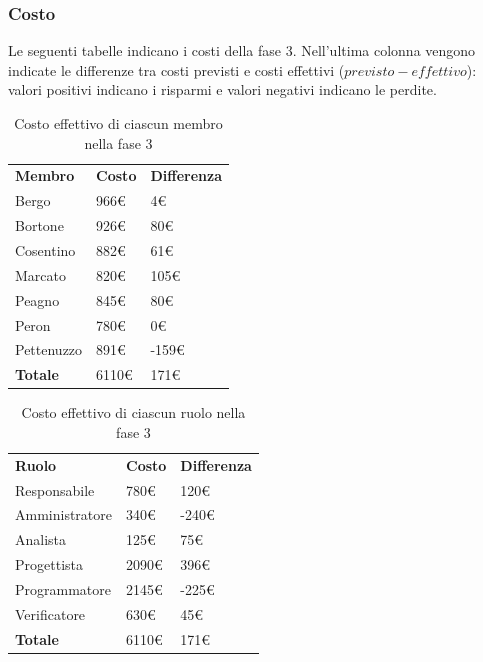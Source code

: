 	\subsubsection{Costo}
		Le seguenti tabelle indicano i costi della fase 3. Nell'ultima colonna vengono indicate le differenze tra costi previsti e costi effettivi ($previsto - effettivo$): valori positivi indicano i risparmi e valori negativi indicano le perdite.
		
		\begin{table}[H]
			\centering
			\begin{tabular}{| l | l | l |}
				\rowcolor{LightBlue}
				\textbf{\color{white}Membro}
				& \textbf{\color{white}Costo}
				& \textbf{\color{white}Differenza}\\
				Bergo		& 966€	& 4€\\
				Bortone		& 926€	& 80€\\
				Cosentino	& 882€	& 61€\\
				Marcato		& 820€	& 105€\\
				Peagno		& 845€	& 80€\\
				Peron		& 780€	& 0€\\
				Pettenuzzo	& 891€	& -159€\\ \hline
				\textbf{Totale} & 6110€	& 171€\\ \hline
			\end{tabular}
			\caption{Costo effettivo di ciascun membro nella fase 3}	
		\end{table}
	
	
	\begin{table}[H]
		\centering
		\begin{tabular}{| l | l |l|}
			\rowcolor{LightBlue}
			\textbf{\color{white}Ruolo}
			& \textbf{\color{white}Costo}
			& \textbf{\color{white}Differenza}\\
			
			Responsabile	& 780€	& 120€\\
			Amministratore 	& 340€ 	& -240€\\
			Analista 		& 125€ 	& 75€\\
			Progettista 	& 2090€	& 396€\\
			Programmatore 	& 2145€	& -225€\\
			Verificatore 	& 630€	& 45€\\ \hline
			\textbf{Totale} & 6110€	& 171€\\ \hline
		\end{tabular}
		\caption{Costo effettivo di ciascun ruolo nella fase 3}
	\end{table}


